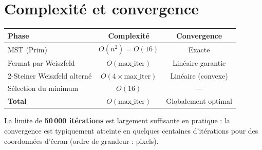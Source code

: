 \documentclass[12pt, a4paper]{article}
\begin{document}
\section{Complexité et convergence}

\begin{center}
\begin{tabular}{lcc}
\toprule
\textbf{Phase} & \textbf{Complexité} & \textbf{Convergence} \\
\midrule
MST (Prim) & $O(n^2) = O(16)$ & Exacte \\
Fermat par Weiszfeld & $O(\text{max\_iter})$ & Linéaire garantie \\
2-Steiner Weiszfeld alterné & $O(4 \times \text{max\_iter})$ & Linéaire (convexe) \\
Sélection du minimum & $O(16)$ & — \\
\midrule
\textbf{Total} & $O(\text{max\_iter})$ & Globalement optimal \\
\bottomrule
\end{tabular}
\end{center}

\medskip

La limite de \textbf{50\,000 itérations} est largement suffisante en pratique :
la convergence est typiquement atteinte en quelques centaines d'itérations pour
des coordonnées d'écran (ordre de grandeur : pixels).
\end{document}
